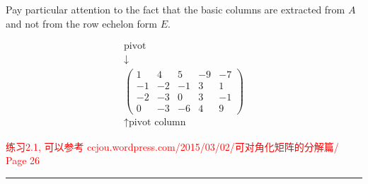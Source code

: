 \documentclass[10pt, a4paper]{article}
\begin{document}
Pay particular attention to the fact that the basic columns are extracted from \( A \) and not from the row echelon form \( E \).

\[
\begin{array}{c}
\text{pivot} \\
\downarrow \\
\begin{pmatrix}
1 & 4 & 5 & -9 & -7 \\
-1 & -2 & -1 & 3 & 1 \\
-2 & -3 & 0 & 3 & -1 \\
0 & -3 & -6 & 4 & 9
\end{pmatrix}\\
\uparrow \text{pivot column}
\end{array}
\]

\textcolor{red}{练习2.1, 可以参考 ccjou.wordpress.com/2015/03/02/可对角化矩阵的分解篇/ Page 26}
\color{red}\rule{\textwidth}{0.4pt}\color{black}
\end{document}
